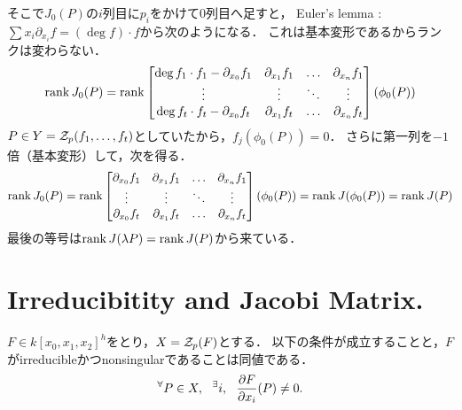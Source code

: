 \documentclass[a4paper]{jsarticle}
\begin{document}
    そこで$J_0(P)$の$i$列目に$p_i$をかけて0列目へ足すと，
    Euler's lemma : $\sum x_i \partial_{x_i} f=(\deg f) \cdot f$から次のようになる．
    これは基本変形であるからランクは変わらない．
    \[
        \operatorname{rank} J_0(P)
        =
        \operatorname{rank}
        \begin{bmatrix}
            \deg f_1 \cdot f_1-\partial_{x_0} f_1    & \partial_{x_1} f_1 & \dots  & \partial_{x_n} f_1  \\
            \vdots      &          \vdots              & \ddots &          \vdots               \\
            \deg f_t \cdot f_t-\partial_{x_0} f_t    & \partial_{x_1} f_t & \dots  & \partial_{x_n} f_t  \\
        \end{bmatrix}
        (\phi_0(P))
    \]
    $P \in Y=\mathcal{Z}_p(f_1,\dots,f_t)$としていたから，$f_j(\phi_0(P))=0$．
    さらに第一列を$-1$倍（基本変形）して，次を得る．
    \[
        \operatorname{rank} J_0(P)
        =
        \operatorname{rank}
        \begin{bmatrix}
            \partial_{x_0} f_1    & \partial_{x_1} f_1 & \dots  & \partial_{x_n} f_1  \\
            \vdots      &          \vdots              & \ddots &          \vdots               \\
            \partial_{x_0} f_t    & \partial_{x_1} f_t & \dots  & \partial_{x_n} f_t  \\
        \end{bmatrix}
        (\phi_0(P))
        =\operatorname{rank} J(\phi_0(P))
        =\operatorname{rank} J(P)
    \]
    最後の等号は$\operatorname{rank} J(\lambda P)=\operatorname{rank} J(P)$から来ている．

\section{Irreducibitity and Jacobi Matrix.} %
    $F \in k[x_0, x_1, x_2]^h$をとり，$X=\mathcal{Z}_p(F)$とする．
    以下の条件が成立することと，$F$がirreducibleかつnonsingularであることは同値である．
    \[ {}^{\forall} P \in X,~~ {}^{\exists} i,~~ \frac{\partial F}{\partial x_i}(P) \neq 0. \label{prop:1} \]
\end{document}
